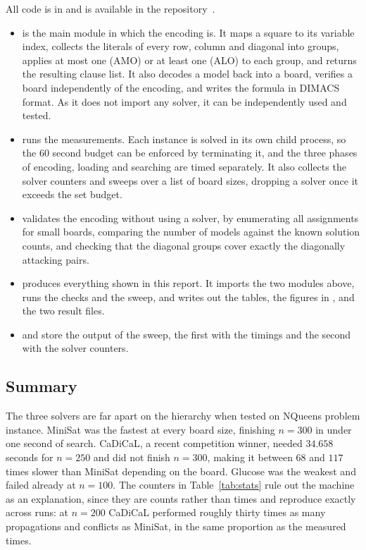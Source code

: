 \documentclass[11pt,a4paper]{article}
\begin{document}
All code is in  and is available in the
repository~\cite{repo}.

\begin{itemize}
  \item {} is the main module in which the encoding is. It maps
  a square to its variable index, collects the literals of every row, column
  and diagonal into groups, applies at most one (AMO) or at least one (ALO) to each
  group, and returns the resulting clause list. It also decodes a model back
  into a board, verifies a board independently of the encoding, and writes
  the formula in DIMACS format. As it does not import any solver, it can be independently
  used and tested.

  \item {} runs the measurements. Each instance is solved in
  its own child process, so the 60 second budget can be enforced by
  terminating it, and the three phases of encoding, loading and
  searching are timed separately. It also collects the solver counters and
  sweeps over a list of board sizes, dropping a solver once it exceeds the
  set budget.

  \item {} validates the encoding without using a
  solver, by enumerating all assignments for small boards, comparing the
  number of models against the known solution counts, and checking that the
  diagonal groups cover exactly the diagonally attacking pairs.

  \item {} produces everything shown in this report.
  It imports the two modules above, runs the checks and the sweep, and
  writes out the tables, the figures in , and the two
  result files.

  \item {} and  store the output of the
  sweep, the first with the timings and the second with the solver counters.
\end{itemize}

\subsection*{Summary}

The three solvers are far apart on the hierarchy when tested on NQueens problem instance.
MiniSat was the fastest at every board size, finishing
$n=300$ in under one second of search. CaDiCaL, a recent competition winner,
needed $34.658$ seconds for $n=250$ and did not finish $n=300$, making it
between $68$ and $117$ times slower than MiniSat depending on the board.
Glucose was the weakest and failed already at $n=100$. The counters in
Table~\ref{tab:stats} rule out the machine as an explanation, since they are
counts rather than times and reproduce exactly across runs: at $n=200$
CaDiCaL performed roughly thirty times as many propagations and conflicts as
MiniSat, in the same proportion as the measured times.
\end{document}
